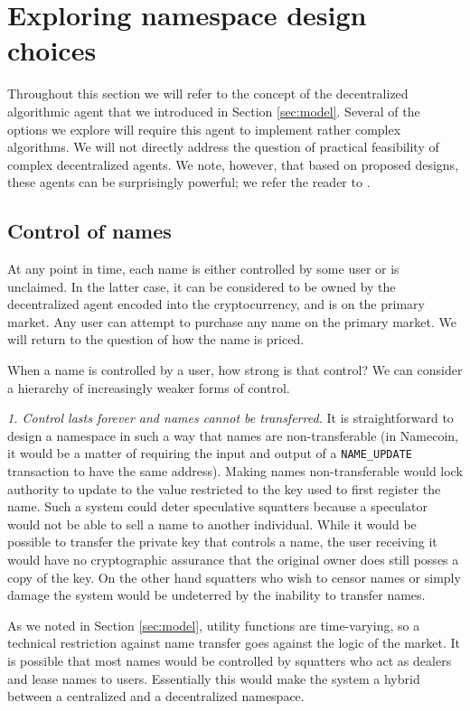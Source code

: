 \section{Exploring namespace design choices}
\label{sec:design}

Throughout this section we will refer to the concept of the decentralized algorithmic agent that we introduced in Section \ref{sec:model}. Several of the options we explore will require this agent to implement rather complex algorithms. We will not directly address the question of practical feasibility of complex decentralized agents. We note, however, that based on proposed designs, these agents can be surprisingly powerful; we refer the reader to \cite{bonneau2014decentralizing,ethereumwhitepaper,agents}.


\subsection{Control of names}
At any point in time, each name is either controlled by some user or is unclaimed. In the latter case, it can be considered to be owned by the decentralized agent encoded into the cryptocurrency, and is on the primary market. Any user can attempt to purchase any name on the primary market. We will return to the question of how the name is priced. 

When a name is controlled by a user, how strong is that control? We can consider a hierarchy of increasingly weaker forms of control.

{\em 1. Control lasts forever and names cannot be transferred.} It is straightforward to design a namespace in such a way that names are non-transferable (in Namecoin, it would be a matter of requiring the input and output of a {\tt NAME\_UPDATE} transaction to have the same address). Making names non-transferable would lock authority to update to the value restricted to the key used to first register the name. Such a system could deter speculative squatters because a speculator would not be able to sell a name to another individual. While it would be possible to transfer the private key that controls a name, the user receiving it would have no cryptographic assurance that the original owner does still posses a copy of the key. On the other hand squatters who wish to censor names or simply damage the system would be undeterred by the inability to transfer names.

As we noted in Section \ref{sec:model}, utility functions are time-varying, so a technical restriction against name transfer goes against the logic of the market. It is possible that most names would be controlled by squatters who act as dealers and lease names to users. Essentially this would make the system a hybrid between a centralized and a decentralized namespace.


